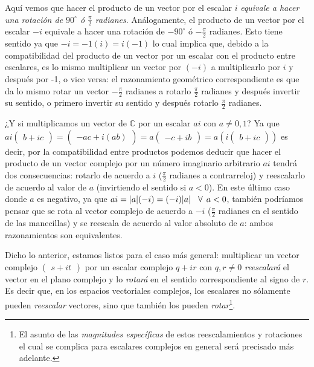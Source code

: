 \documentclass[apuntes]{subfiles}
\begin{document}
   Aquí vemos que hacer el producto de un vector por el escalar $i$ \emph{equivale a hacer una rotación de $90^\circ$ ó $\frac{\pi}{2}$ radianes}. Análogamente, el producto de un vector por el escalar $-i$ equivale a hacer una rotación de $-90^\circ$ ó $-\frac{\pi}{2}$ radianes. Esto tiene sentido ya que $-i=-1(i)=i(-1)$ lo cual implica que, debido a la compatibilidad del producto de un vector por un escalar con el producto entre escalares, es lo mismo multiplicar un vector por $(-i)$ a multiplicarlo por $i$ y después por -1, o vice versa: el razonamiento geométrico correspondiente es que da lo mismo rotar un vector $-\frac{\pi}{2}$ radianes a rotarlo $\frac{\pi}{2}$ radianes y después invertir su sentido, o primero invertir su sentido y después rotarlo $\frac{\pi}{2}$ radianes. 

   ¿Y si multiplicamos un vector de $\mathbb{C}$ por un escalar $ai$ con $a\neq 0,1$? Ya que $ai\begin{pmatrix}b + ic\end{pmatrix}=\begin{pmatrix}-ac+i(ab)\end{pmatrix}=a\begin{pmatrix}-c+ib\end{pmatrix}=a(i\begin{pmatrix}b+ic\end{pmatrix})$ \textemdash es decir, por la compatibilidad entre productos\textemdash\hspace{0.5mm} podemos deducir que hacer el producto de un vector complejo por un número imaginario arbitrario $ai$ tendrá dos consecuencias: rotarlo de acuerdo a $i$ ($\frac{\pi}{2}$ radianes a contrarreloj) y reescalarlo de acuerdo al valor de $a$ (invirtiendo el sentido si $a<0$). En este último caso donde $a$ es negativo, ya que $ai=|a|(-i)=(-i)|a| \hspace{3mm}\forall\hspace{1.5mm} a<0$, también podríamos pensar que se rota al vector complejo de acuerdo a $-i$ ($\frac{\pi}{2}$ radianes en el sentido de las manecillas) y se reescala de acuerdo al valor absoluto de $a$: ambos razonamientos son equivalentes.

Dicho lo anterior, estamos listos para el caso más general: multiplicar un vector complejo $\begin{pmatrix}s+it\end{pmatrix}$ por un escalar complejo $q+ir$ con $q,r\neq0$ \emph{reescalará} el vector en el plano complejo y lo \emph{rotará} en el sentido correspondiente al signo de $r$. Es decir que, en los espacios vectoriales complejos, los escalares no sólamente pueden \emph{reescalar} vectores, sino que también los pueden \emph{rotar}\footnote{El asunto de las \emph{magnitudes específicas} de estos reescalamientos y rotaciones \textemdash el cual se complica para escalares complejos en general\textemdash\hspace{0.5mm} será precisado más adelante.}.
\end{document}
